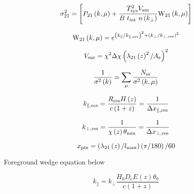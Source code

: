 \begin{equation}
\sigma_{21}^2 = \left[ P_{21}\left(k, \mu \right) + \frac{T^2_{\rm sys} V_{\rm sur}}{B \ t_{\rm int} \ n \left(k_{\perp}\right)} {\rm W}_{21}\left(k, \mu \right) \right]
\end{equation}

\begin{equation}
{\rm W}_{21}\left(k, \mu \right) = e^{\left(k_{\parallel} / k_{\parallel, \rm res} \right)^2 + \left(k_{\perp} / k_{\perp, \rm res} \right)^2}
\end{equation}

\begin{equation}
V_{\rm sur} = \chi^2 \Delta \chi \left( \lambda_{21} \left( z \right)^2 / A_e\right)^2
\end{equation}

\begin{equation}
\frac{1}{\sigma^2 \left( k \right)} = \sum_{\mu} \frac{N_{\rm m}}{\sigma^2 \left( k, \mu \right)}
\end{equation}

\begin{equation}
k_{\parallel, \rm res} = \frac{R_{\rm res} H \left( z\right)}{c \left(1 + z\right)} = \frac{1}{\Delta x_{\parallel, \rm res}}
\end{equation}

\begin{equation}
k_{\perp, \rm res} = \frac{1}{\chi \left( z \right) \theta_{\rm min}} = \frac{1}{\Delta x_{\perp, \rm res}}
\end{equation}

\begin{equation}
x_{\rm pix} = \left( \lambda_{21} \left( z \right) / l_{\rm max}\right) \left( \pi / 180 \right) / 60
\end{equation}

Foreground wedge equation below

\begin{equation}
k_{\parallel} = k_{\perp} \frac{H_0 D_c E \left( z \right) \theta_0}{c \left( 1 + z \right)}
\end{equation}
